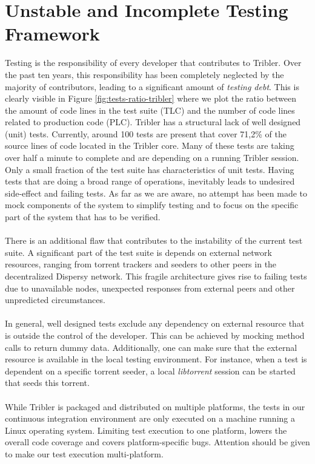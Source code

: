 \section{Unstable and Incomplete Testing Framework}
Testing is the responsibility of every developer that contributes to Tribler. Over the past ten years, this responsibility has been completely neglected by the majority of contributors, leading to a significant amount of \emph{testing debt}. This is clearly visible in Figure \ref{fig:tests-ratio-tribler} where we plot the ratio between the amount of code lines in the test suite (TLC) and the number of code lines related to production code (PLC). Tribler has a structural lack of well designed (unit) tests. Currently, around 100 tests are present that cover 71,2\% of the source lines of code located in the Tribler core. Many of these tests are taking over half a minute to complete and are depending on a running Tribler session. Only a small fraction of the test suite has characteristics of unit tests. Having tests that are doing a broad range of operations, inevitably leads to undesired side-effect and failing tests. As far as we are aware, no attempt has been made to mock components of the system to simplify testing and to focus on the specific part of the system that has to be verified.\\\\
There is an additional flaw that contributes to the instability of the current test suite. A significant part of the test suite is depends on external network resources, ranging from torrent trackers and seeders to other peers in the decentralized Dispersy network. This fragile architecture gives rise to failing tests due to unavailable nodes, unexpected responses from external peers and other unpredicted circumstances.\\\\
In general, well designed tests exclude any dependency on external resource that is outside the control of the developer. This can be achieved by mocking method calls to return dummy data. Additionally, one can make sure that the external resource is available in the local testing environment. For instance, when a test is dependent on a specific torrent seeder, a local \emph{libtorrent} session can be started that seeds this torrent.\\\\
While Tribler is packaged and distributed on multiple platforms, the tests in our continuous integration environment are only executed on a machine running a Linux operating system. Limiting test execution to one platform, lowers the overall code coverage and covers platform-specific bugs\cite{beller2016oops}. Attention should be given to make our test execution multi-platform.

